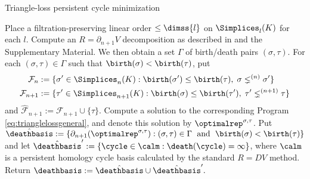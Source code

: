 \begin{algorithm}
\caption{Triangle-loss persistent cycle minimization}
\label{alg:rdvvolumeoptimization}
\begin{algorithmic}[1]
\STATE Place a filtration-preserving linear order $\le\dimss{l}$ on $\Simplices_l(K)$ for each $l$.
\STATE Compute an $R = \partial_{n+1} V$ decomposition as described in \cite{cohen2006vines} and the Supplementary Material.  We then obtain a set $\Gamma$ 
of birth/death pairs $(\sigma, \tau)$.
\STATE For each $(\sigma, \tau) \in \Gamma$ such that $\birth(\sigma) < \birth(\tau)$,  put 
    \begin{align*}
        \mathcal{F}_n &:= \{\sigma' \in \Simplices_n(K) : \birth(\sigma') \le \birth(\tau), \; \sigma \lneq^{(n)} \sigma'\} 
        \\
        \mathcal{F}_{n+1} &: = \{ \tau' \in \Simplices_{n+1}(K) : \birth(\sigma) \le \birth(\tau'), \; \tau' \lneq^{(n+1)} \tau \} 
    \end{align*}
    and ${\hat {\mathcal{F}}}_{n+1}:= \mathcal{F}_{n+1} \cup \{\tau\}$.  Compute a  solution to the corresponding Program \eqref{eq:trianglelossgeneral}, and denote this solution by  $\optimalrep^{\sigma, \tau}$. 
    \STATE Put   
        $
            \hat \deathbasis: = \{ \partial_{n+1} (\optimalrep^{\sigma, \tau}) : (\sigma, \tau ) \in  \Gamma \; \text{ and } \; \birth(\sigma) < \birth(\tau)\}$ 
            and let $\hat \deathbasis' := \{ \cycle \in \calm : \death(\cycle) = \infty  \}$, where $\calm$ is a persistent homology cycle basis calculated by the standard $R=DV$ method.
    \STATE Return $\deathbasis: = \hat \deathbasis \cup \hat \deathbasis'.$
\end{algorithmic}
\end{algorithm}

